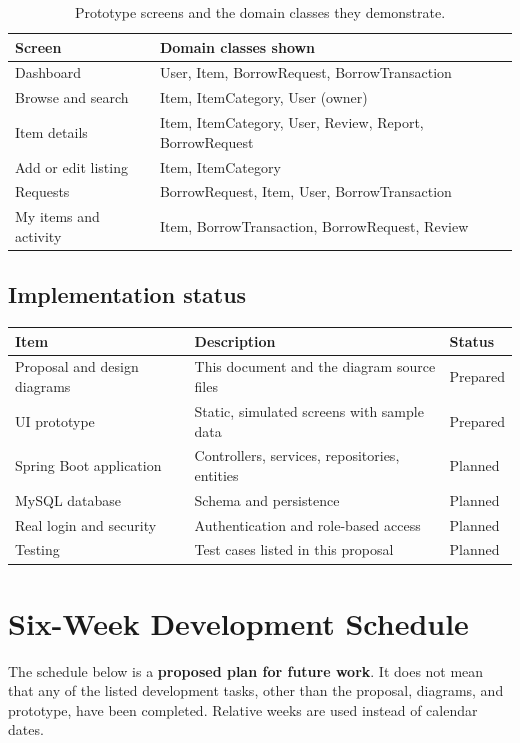 \documentclass[11pt,a4paper]{article}
\begin{document}
\begin{table}[H]
\centering
\caption{Prototype screens and the domain classes they demonstrate.}
\begin{tabularx}{\textwidth}{@{}l X@{}}
\toprule
\textbf{Screen} & \textbf{Domain classes shown}\\
\midrule
Dashboard & User, Item, BorrowRequest, BorrowTransaction\\
Browse and search & Item, ItemCategory, User (owner)\\
Item details & Item, ItemCategory, User, Review, Report, BorrowRequest\\
Add or edit listing & Item, ItemCategory\\
Requests & BorrowRequest, Item, User, BorrowTransaction\\
My items and activity & Item, BorrowTransaction, BorrowRequest, Review\\
\bottomrule
\end{tabularx}
\end{table}

\subsection*{Implementation status}
\begin{tabularx}{\textwidth}{@{}l X l@{}}
\toprule
\textbf{Item} & \textbf{Description} & \textbf{Status}\\
\midrule
Proposal and design diagrams & This document and the diagram source files & Prepared\\
UI prototype & Static, simulated screens with sample data & Prepared\\
Spring Boot application & Controllers, services, repositories, entities & Planned\\
MySQL database & Schema and persistence & Planned\\
Real login and security & Authentication and role-based access & Planned\\
Testing & Test cases listed in this proposal & Planned\\
\bottomrule
\end{tabularx}

\section{Six-Week Development Schedule}
The schedule below is a \textbf{proposed plan for future work}. It does not mean that any of the listed development tasks, other than the proposal, diagrams, and prototype, have been completed. Relative weeks are used instead of calendar dates.
\end{document}
